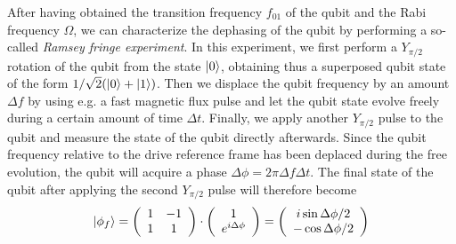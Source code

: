 After having obtained the transition frequency $f_{01}$ of the qubit and the Rabi frequency $\Omega$, we can characterize the dephasing of the qubit by performing a so-called {\it Ramsey fringe experiment}. In this experiment, we first perform a $Y_{\pi/2}$ rotation of the qubit from the state $\left| 0 \right>$, obtaining thus a superposed qubit state of the form $1/\sqrt{2}(\left| 0 \right>+\left| 1 \right>)$. Then we displace the qubit frequency by an amount $\Delta f$ by using e.g. a fast magnetic flux pulse and let the qubit state evolve freely during a certain amount of time $\Delta t$. Finally, we apply another $Y_{\pi/2}$ pulse to the qubit and measure the state of the qubit directly afterwards. Since the qubit frequency relative to the drive reference frame has been deplaced during the free evolution, the qubit will acquire a phase $\Delta \phi = 2\pi\Delta f \Delta t$. The final state of the qubit after applying the second $Y_{\pi/2}$ pulse will therefore become
%
\begin{equation}
\left| \phi_f \right> = \left(\begin{array}{cc} 1 & -1 \\ 1 & 1 \end{array} \right)\cdot\left(\begin{array}{c} 1 \\ e^{i\Delta\phi} \end{array}\right) = \left( \begin{array}{c} i\sin{\Delta\phi/2} \\ -\cos{\Delta\phi/2}\end{array}\right)
\end{equation}
%
